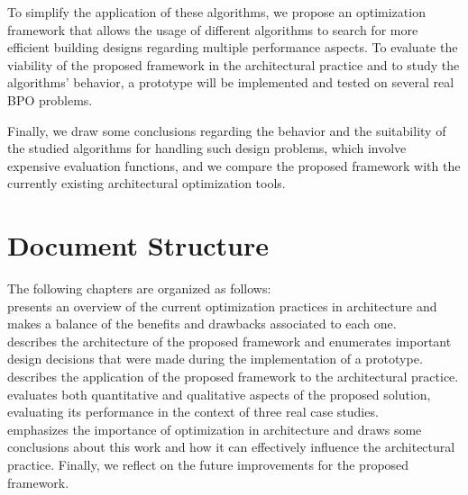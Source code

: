 To simplify the application of these algorithms, we propose an optimization framework that allows the usage of different algorithms to search for more efficient building designs regarding multiple performance aspects. To evaluate the viability of the proposed framework in the architectural practice and to study the algorithms' behavior, a prototype will be implemented and tested on several real \ac{BPO} problems. 

Finally, we draw some conclusions regarding the behavior and the suitability of the studied algorithms for handling such design problems, which involve expensive evaluation functions, and we compare the proposed framework with the currently existing architectural optimization tools.

\section{Document Structure}
The following chapters are organized as follows: \\ 
\textbf{} presents an overview of the current optimization practices in architecture and makes a balance of the benefits and drawbacks associated to each one.  \\
\textbf{} describes the architecture of the proposed framework and enumerates important design decisions that were made during the implementation of a prototype. \\
\textbf{} describes the application of the proposed framework to the architectural practice. \\
\textbf{} evaluates both quantitative and qualitative aspects of the proposed solution, evaluating its performance in the context of three real case studies. \\
\textbf{} emphasizes the importance of optimization in architecture and draws some conclusions about this work and how it can effectively influence the architectural practice. Finally, we reflect on the future improvements for the proposed framework. \\
